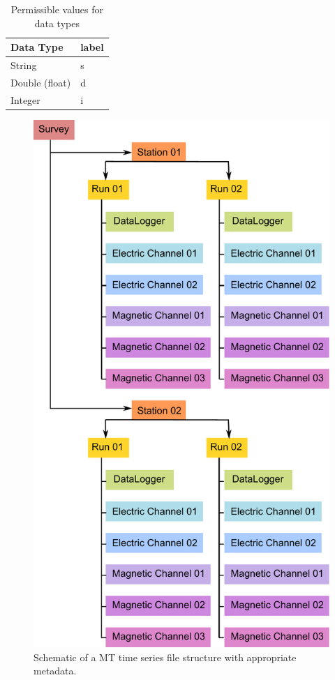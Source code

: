 \documentclass{article}
\begin{document}
\begin{table}[htb!]
	\caption[Data types]{Permissible values for data types}
	\begin{tabular}{|l|l|}
		\hline
		Data Type & label \\
		\hline
		String & s \\ \hline
		Double (float) & d \\ \hline
		Integer & i \\
		\hline
	\end{tabular}
	\label{tab:types}
\end{table}

\begin{figure}[htb!]
	\centering
	\includegraphics[height=.9\textheight]{example_mt_file_structure.pdf}
	\caption{Schematic of a MT time series file structure with appropriate metadata.}
	\label{fig:example}
\end{figure}
\end{document}
